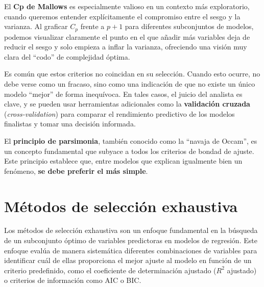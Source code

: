 \documentclass[
  letterpaper,
  DIV=11,
  numbers=noendperiod]{scrreprt}
\begin{document}
El \textbf{Cp de Mallows} es especialmente valioso en un contexto más
exploratorio, cuando queremos entender explícitamente el compromiso
entre el sesgo y la varianza. Al graficar \(C_p\) frente a \(p+1\) para
diferentes subconjuntos de modelos, podemos visualizar claramente el
punto en el que añadir más variables deja de reducir el sesgo y solo
empieza a inflar la varianza, ofreciendo una visión muy clara del
``codo'' de complejidad óptima.

Es común que estos criterios no coincidan en su selección. Cuando esto
ocurre, no debe verse como un fracaso, sino como una indicación de que
no existe un único modelo ``mejor'' de forma inequívoca. En tales casos,
el juicio del analista es clave, y se pueden usar herramientas
adicionales como la \textbf{validación cruzada}
(\emph{cross-validation}) para comparar el rendimiento predictivo de los
modelos finalistas y tomar una decisión informada.

\begin{tcolorbox}[enhanced jigsaw, leftrule=.75mm, breakable, colbacktitle=quarto-callout-important-color!10!white, bottomrule=.15mm, colframe=quarto-callout-important-color-frame, toprule=.15mm, colback=white, coltitle=black, bottomtitle=1mm, left=2mm, title=\textcolor{quarto-callout-important-color}{\faExclamation}\hspace{0.5em}{El Principio de Parsimonia en la Selección de Modelos}, opacityback=0, arc=.35mm, opacitybacktitle=0.6, toptitle=1mm, titlerule=0mm, rightrule=.15mm]

El \textbf{principio de parsimonia}, también conocido como la ``navaja
de Occam'', es un concepto fundamental que subyace a todos los criterios
de bondad de ajuste. Este principio establece que, entre modelos que
explican igualmente bien un fenómeno, \textbf{se debe preferir el más
simple}.

\end{tcolorbox}

\section{Métodos de selección
exhaustiva}\label{muxe9todos-de-selecciuxf3n-exhaustiva}

Los métodos de selección exhaustiva son un enfoque fundamental en la
búsqueda de un subconjunto óptimo de variables predictoras en modelos de
regresión. Este enfoque evalúa de manera sistemática diferentes
combinaciones de variables para identificar cuál de ellas proporciona el
mejor ajuste al modelo en función de un criterio predefinido, como el
coeficiente de determinación ajustado (\(R^2\) ajustado) o criterios de
información como AIC o BIC.
\end{document}
